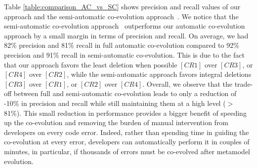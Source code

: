 Table \ref{table:comparison_AC_vs_SC} shows precision and recall values of our approach and the semi-automatic co-evolution approach~\cite{Khelladi2020}. 
We notice that the semi-automatic co-evolution approach~\cite{Khelladi2020} outperforms our automatic co-evolution approach by a small margin in terms of precision and recall. %
On average, we had 82\% precision and 81\% recall in full automatic co-evolution compared to 92\% precision and 91\% recall in semi-automatic co-evolution. 
This is due to the fact that our approach favors the least deletion when possible $[CR1]$ over $[CR3]$, or $[CR4]$ over $[CR2]$, while the semi-automatic approach favors integral deletions $[CR3]$ over $[CR1]$, or $[CR2]$ over $[CR4]$. %
Overall, we observe that the trade-off between full and semi-automatic co-evolution leads to only a reduction of -10\% in precision and recall while still maintaining them at a high level ($>$ 81\%). This small reduction in performance provides a bigger benefit of speeding up the co-evolution and removing the burden of manual intervention from developers on every code error. Indeed, rather than spending time in guiding the co-evolution at every error, developers can automatically perform it in couples of minutes, in particular, if thousands of errors must be co-evolved after metamodel evolution.


